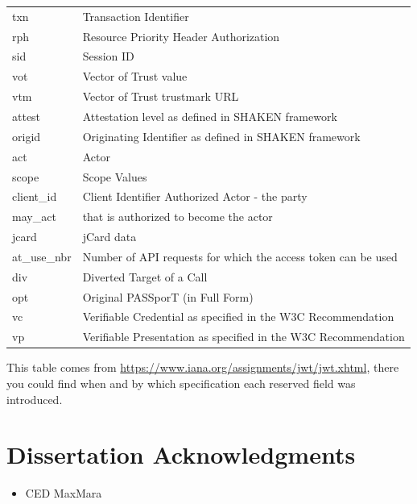 \documentclass[11pt]{style}
\begin{document}
{\begin{longtable}{||l|l|}
        txn                       & Transaction Identifier\\
        rph                       & Resource Priority Header Authorization\\
        sid                       & Session ID\\
        vot                       & Vector of Trust value\\
        vtm                       & Vector of Trust trustmark URL\\
        attest                    & Attestation level as defined in SHAKEN framework\\
        origid                    & Originating Identifier as defined in SHAKEN framework\\
        act                       & Actor\\
        scope                     & Scope Values\\
        client\_id                 & Client Identifier Authorized Actor - the party\\
        may\_act                   & that is authorized to become the actor\\
        jcard                     & jCard data\\
        at\_use\_nbr                & Number of API requests for which the access token can be used\\
        div                       & Diverted Target of a Call\\
        opt                       & Original PASSporT (in Full Form)\\
        vc                        & Verifiable Credential as specified in the W3C Recommendation\\
        vp                        & Verifiable Presentation as specified in the W3C Recommendation\\
        \hline
    \end{longtable}
}

This table comes from \url{https://www.iana.org/assignments/jwt/jwt.xhtml},
there you could find when and by which specification each reserved field was
introduced.

\restoregeometry

\section{Dissertation Acknowledgments}
\begin{itemize}
    \item CED MaxMara
\end{itemize}
\end{document}
